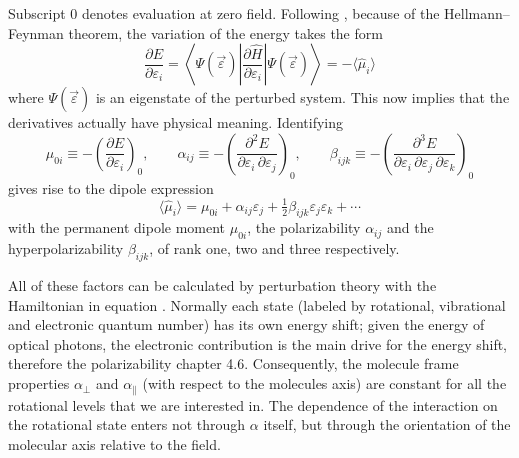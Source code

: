 Subscript $0$ denotes evaluation at zero field. Following \cite{atkinsMolecularQuantum}, because of the Hellmann--Feynman theorem, the variation of the energy takes the form
\begin{equation}
    \frac{\partial E}{\partial\varepsilon_i} = \left\langle \Psi(\vec\varepsilon)\left|\frac{\partial \hat H}{\partial\varepsilon_i}\right|\Psi(\vec\varepsilon)\right\rangle = -\langle\hat\mu_i\rangle
    \label{eq:hellmann_feynman}
\end{equation}
where $\Psi(\vec\varepsilon)$ is an eigenstate of the perturbed system. This now implies that the derivatives actually have physical meaning. Identifying
\begin{equation}
    \mu_{0i} \equiv -\left(\frac{\partial E}{\partial\varepsilon_i}\right)_{\!0}, \qquad \alpha_{ij} \equiv -\left(\frac{\partial^2 E}{\partial\varepsilon_i\,\partial\varepsilon_j}\right)_{\!0}, \qquad \beta_{ijk} \equiv -\left(\frac{\partial^3 E}{\partial\varepsilon_i\,\partial\varepsilon_j\,\partial\varepsilon_k}\right)_{\!0}
    \label{eq:moment_definitions}
\end{equation}
gives rise to the dipole expression
\begin{equation}
    \langle\hat\mu_i\rangle = \mu_{0i} + \alpha_{ij}\varepsilon_j + \tfrac{1}{2}\beta_{ijk}\varepsilon_j\varepsilon_k + \cdots
    \label{eq:dipole_expansion}
\end{equation}
with the permanent dipole moment $\mu_{0i}$, the polarizability $\alpha_{ij}$ and the hyperpolarizability $\beta_{ijk}$, of rank one, two and three respectively.

All of these factors can be calculated by perturbation theory with the Hamiltonian in equation . Normally each state (labeled by rotational, vibrational and electronic quantum number) has its own energy shift; given the energy of optical photons, the electronic contribution is the main drive for the energy shift, therefore the polarizability \cite{kremsMoleculesElectromagneticFields2019} chapter 4.6. Consequently, the molecule frame properties $\alpha_\perp$ and $\alpha_\parallel$ (with respect to the molecules axis) are constant for all the rotational levels that we are interested in. The dependence of the interaction on the rotational state enters not through $\alpha$ itself, but through the orientation of the molecular axis relative to the field.

